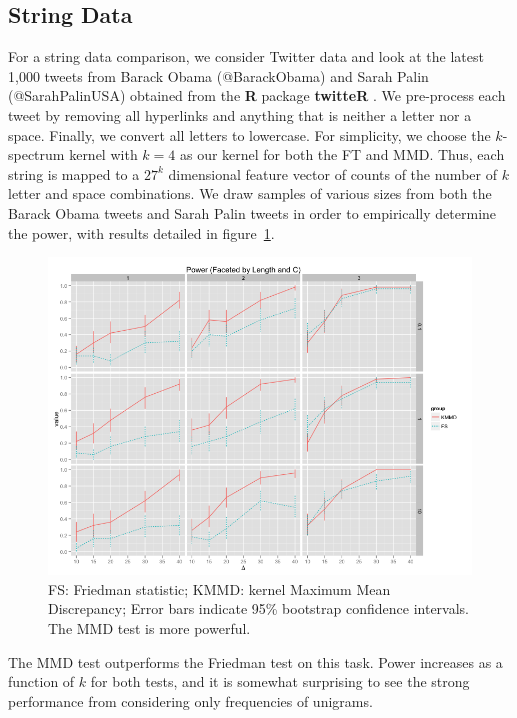 \subsection{String Data}
\label{twitter_data}
For a string data comparison, we consider Twitter data and look at the
latest 1,000 tweets from Barack Obama (@BarackObama) and Sarah Palin
(@SarahPalinUSA) obtained from the {\bf R} package {\bf twitteR}
\cite{twitteR}.  We pre-process each tweet by removing all
hyperlinks and anything that is neither a letter nor a space.
Finally, we convert all letters to lowercase.  For simplicity, we
choose the $k$-spectrum kernel \cite{leslie2002spectrum} with $k=4$ 
as our kernel for both the FT and MMD.  Thus, each string is mapped to
a $27^k$ dimensional feature vector of counts of the number of $k$
letter and space combinations.  We draw samples of various sizes from
both the Barack Obama tweets and Sarah Palin tweets in order to
empirically determine the power, with results detailed in
figure~\ref{fig:power_string}.

\begin{figure}
  \centering
  \includegraphics[width=\linewidth]{power_string.png}
  \caption{FS: Friedman statistic; KMMD: kernel Maximum Mean
    Discrepancy; Error bars indicate 95\% bootstrap confidence
    intervals.  The MMD test is more powerful.}
  \label{fig:power_string}
\end{figure}

The MMD test outperforms the Friedman test on this task.  Power
increases as a function of $k$ for both tests, and it is somewhat
surprising to see the strong performance from considering only
frequencies of unigrams.

